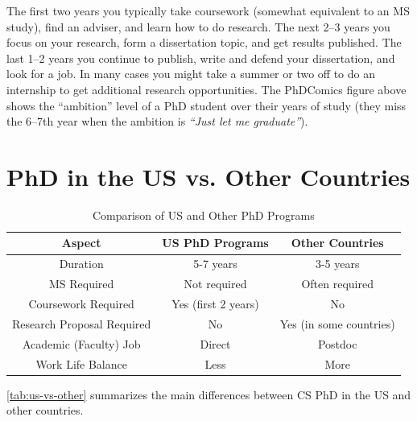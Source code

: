 \documentclass[oneside,11pt,dvipsnames]{book}
\newenvironment{commentbox}[1][]{
  \small
  \begin{mybox}
    {\small \textbf{#1}}
  }{
  \end{mybox}
}
\def\sectioninfo#1{%
  \addcontentsline{toc}{sectioninfo}{%
    \noexpand\numberline{}\color{black}{#1}}%
}
\begin{document}
The first two years you typically take coursework (somewhat equivalent to an MS study), find an adviser, and learn how to do research.  The next 2--3 years you focus on your research, form a dissertation topic, and get results published. The last 1--2 years you continue to publish, write and defend your dissertation, and look for a job.
In many cases you might take a summer or two off to do an internship to get additional research opportunities.
The PhDComics figure above shows the ``ambition'' level of a PhD student over their years of study (they miss the 6--7th year when the ambition is \emph{``Just let me graduate''}).








\section{PhD in the US vs. Other Countries}\label{sec:non-us-differences}
\sectioninfo{Among several differences, CS PhD in the US does not require an MS degree but has a longer PhD study time.}

\begin{table}
\caption{Comparison of US and Other PhD Programs}\label{tab:us-vs-other}
\begin{tabular}{c|c|c}
\toprule
\textbf{Aspect} & \textbf{US PhD Programs} & \textbf{Other Countries} \\
\midrule
Duration & 5-7 years & 3-5 years \\
MS Required & Not required & Often required \\
Coursework Required & Yes (first 2 years) & No \\
Research Proposal Required & No & Yes (in some countries) \\
Academic (Faculty) Job & Direct & Postdoc \\
Work Life Balance & Less & More \\
\bottomrule
\end{tabular}
\end{table}


\autoref{tab:us-vs-other} summarizes the main differences between CS PhD in the US and other countries. %
\end{document}
